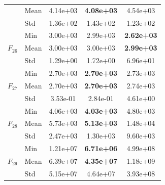 \begin{center}
\begin{longtable}{clccc}
 & Mean & 4.14e+03 & \textbf{4.08e+03} & 4.54e+03 \\
 & Std & 1.36e+02 & 1.43e+02 & 1.23e+02 \\
\midrule
\multirow{3}{*}{$F_{26}$} & Min & 3.00e+03 & 2.99e+03 & \textbf{2.62e+03} \\
 & Mean & 3.00e+03 & 3.00e+03 & \textbf{2.99e+03} \\
 & Std & 1.29e+00 & 1.72e+00 & 6.96e+01 \\
\midrule
\multirow{3}{*}{$F_{27}$} & Min & 2.70e+03 & \textbf{2.70e+03} & 2.73e+03 \\
 & Mean & 2.70e+03 & \textbf{2.70e+03} & 2.74e+03 \\
 & Std & 3.53e-01 & 2.84e-01 & 4.61e+00 \\
\midrule
\multirow{3}{*}{$F_{28}$} & Min & 4.06e+03 & \textbf{4.03e+03} & 4.80e+03 \\
 & Mean & 5.73e+03 & \textbf{5.13e+03} & 1.48e+04 \\
 & Std & 2.47e+03 & 1.30e+03 & 9.60e+03 \\
\midrule
\multirow{3}{*}{$F_{29}$} & Min & 1.21e+07 & \textbf{6.71e+06} & 4.99e+08 \\
 & Mean & 6.39e+07 & \textbf{4.35e+07} & 1.18e+09 \\
 & Std & 5.15e+07 & 4.64e+07 & 3.93e+08 \\
\bottomrule
\end{longtable}
\end{center}